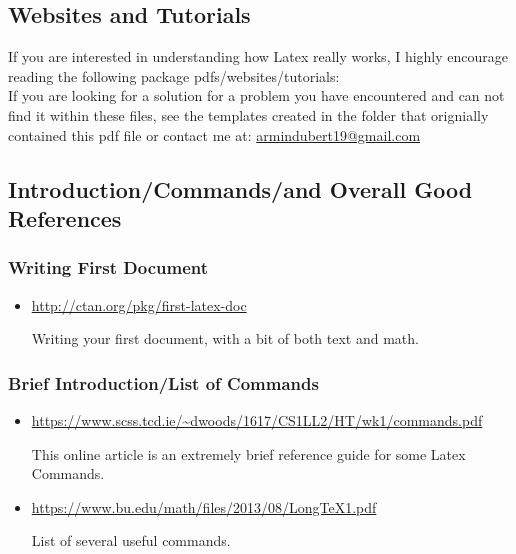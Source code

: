 	\subsection{Websites and Tutorials}
		If you are interested in understanding how Latex really works, I highly encourage reading the following package pdfs/websites/tutorials:\\
		If you are looking for a solution for a problem you have encountered and can not find it within these files, see the templates created in the folder that orignially contained this pdf file or contact me at: \url{armindubert19@gmail.com}
	\subsection{Introduction/Commands/and Overall Good References}
		\subsubsection{Writing First Document}
			\begin{itemize}
				\item \url{http://ctan.org/pkg/first-latex-doc}
					\begin{absquote}
						Writing your first document, with a bit of both text and math.
					\end{absquote}
			\end{itemize}
		\subsubsection{Brief Introduction/List of Commands}
			\begin{itemize}
				\item \url{https://www.scss.tcd.ie/~dwoods/1617/CS1LL2/HT/wk1/commands.pdf}
						\begin{absquote}
							This online article is an extremely brief reference guide for some Latex Commands.
						\end{absquote}
				\item \url{https://www.bu.edu/math/files/2013/08/LongTeX1.pdf}
						\begin{absquote}
							List of several useful commands.
						\end{absquote}
			\end{itemize}
